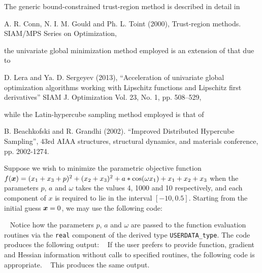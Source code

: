 \documentclass{galahad}
\begin{document}
\galreferences
\vspace*{1mm}

\noindent
The generic bound-constrained trust-region method is described in detail in
\vspace*{1mm}

\noindent
A. R. Conn, N. I. M. Gould and Ph. L. Toint (2000),
Trust-region methods.
SIAM/MPS Series on Optimization,

\noindent
the univariate global minimization method employed is an extension of that
due to
\vspace*{1mm}

\noindent
D. Lera and Ya. D. Sergeyev (2013),
``Acceleration of univariate global optimization algorithms working with
Lipschitz functions and Lipschitz first derivatives''
SIAM J. Optimization Vol. 23, No. 1, pp. 508–529,

\noindent
while the Latin-hypercube sampling method employed is that of
\vspace*{1mm}

\noindent
B. Beachkofski and R. Grandhi (2002).
``Improved Distributed Hypercube Sampling'',
43rd AIAA structures, structural dynamics, and materials conference,
pp. 2002-1274.


\galexamples
Suppose we wish to minimize the parametric objective function
$f({\bm{x}}) = ( x_1 + x_3 + p )^2 + ( x_2 + x_3 )^2 + a * \cos( \omega x_1 ) +     
x_1 + x_2 + x_3$
when the parameters $p$, $a$ and $\omega$ takes the values 4, 1000 and 10
respectively, and each component of $x$ is required to lie in the interval
$[-10,0.5]$.
Starting from the initial guess ${\bm{x}} = 0$, we may use the following code:

{\tt \small
\VerbatimInput{\packageexample}
}
\noindent
Notice how the parameters $p$, $a$ and $\omega$ are passed to the function 
evaluation routines via the {\tt real} component of the derived type 
{\tt USERDATA\_type}.
The code produces the following output:
{\tt \small
\VerbatimInput{\packageresults}
}
\noindent
If the user prefers to provide function, gradient and Hessian information
without calls to specified routines, the following code is appropriate.
{\tt \small
\VerbatimInput{\packageexampleb}
}
\noindent
This produces the same output.
\end{document}
